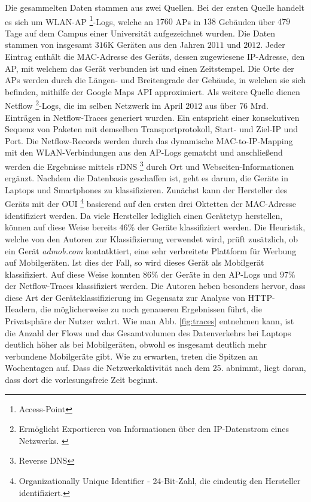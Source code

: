 \documentclass[12pt, a4paper]{article}
\begin{document}
Die gesammelten Daten stammen aus zwei Quellen. Bei der ersten Quelle handelt es sich um WLAN-AP \footnote{Access-Point}-Logs,
welche an $1760$ APs in $138$ Gebäuden über $479$ Tage auf dem Campus einer Universität aufgezeichnet wurden. 
Die Daten stammen von insgesamt $316$\textsc{K} Geräten aus den Jahren $2011$ und $2012$. Jeder Eintrag enthält die 
MAC-Adresse des Geräts, dessen zugewiesene IP-Adresse, den AP, mit welchem das Gerät verbunden ist und einen Zeitstempel.
Die Orte der APs werden durch die Längen- und Breitengrade der Gebäude, in welchen sie sich befinden, mithilfe der Google Maps API
approximiert. Als weitere Quelle dienen Netflow \footnote{Ermöglicht Exportieren von Informationen über den IP-Datenstrom eines 
Netzwerks. \cite{RFC3954}}-Logs, die im selben Netzwerk im April $2012$ aus über $76$ Mrd.
Einträgen in Netflow-Traces generiert wurden. Ein  entspricht einer konsekutiven Sequenz von Paketen
mit demselben Transportprotokoll, Start- und Ziel-IP und Port. \cite{Alipour2018}
Die Netflow-Records werden durch das dynamische MAC-to-IP-Mapping mit den WLAN-Verbindungen aus den AP-Logs gematcht
und anschließend werden die Ergebnisse mittels rDNS \footnote{Reverse DNS} durch Ort und Webseiten-Informationen
ergänzt. Nachdem die Datenbasis geschaffen ist, geht es darum, die Geräte in Laptops und Smartphones zu klassifizieren.\newline
Zunächst kann der Hersteller des Geräts mit der OUI \footnote{Organizationally Unique Identifier - 24-Bit-Zahl, 
die eindeutig den Hersteller identifiziert.} basierend auf den ersten drei Oktetten der MAC-Adresse identifiziert werden.
Da viele Hersteller lediglich einen Gerätetyp herstellen, können auf diese Weise bereits
$46 \%$ der Geräte klassifiziert werden. Die Heuristik, welche von den Autoren zur Klassifizierung verwendet wird,
prüft zusätzlich, ob ein Gerät \textit{admob.com} kontatktiert, eine sehr verbreitete Plattform für Werbung auf Mobilgeräten.
Ist dies der Fall, so wird dieses Gerät als Mobilgerät klassifiziert. Auf diese Weise konnten $86 \%$ der Geräte in den AP-Logs
und $97 \%$ der Netflow-Traces klassifiziert werden. 
Die Autoren heben besonders hervor, dass diese Art der Geräteklassifizierung im Gegensatz zur Analyse von 
HTTP-Headern, die möglicherweise zu noch genaueren Ergebnissen führt, die Privatsphäre der Nutzer wahrt.\newline
Wie man Abb. \ref{fig:traces} entnehmen kann, ist die Anzahl der Flows und das Gesamtvolumen des Datenverkehrs bei Laptops
deutlich höher als bei Mobilgeräten, obwohl es insgesamt deutlich mehr verbundene Mobilgeräte gibt. Wie zu erwarten, 
treten die Spitzen an Wochentagen auf. Dass die Netzwerkaktivität nach dem 25. abnimmt, liegt daran, dass dort
die vorlesungsfreie Zeit beginnt.
\end{document}
